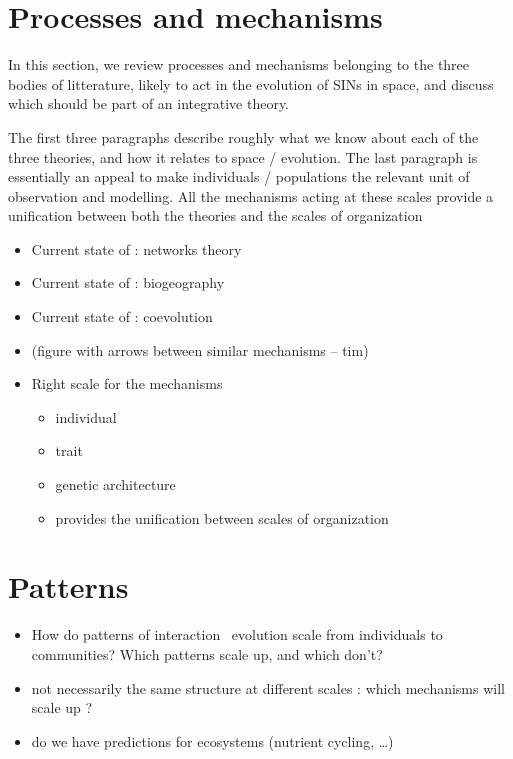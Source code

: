 \documentclass[11pt,oneside]{article}
\begin{document}
\section{Processes and mechanisms}

In this section, we review processes and mechanisms belonging to the three
bodies of litterature, likely to act in the evolution of SINs in space, and
discuss which should be part of an integrative theory.

The first three paragraphs describe roughly what we know about each of the three
theories, and how it relates to space / evolution. The last paragraph is
essentially an appeal to make individuals / populations the relevant unit of
observation and modelling. All the mechanisms acting at these scales provide a
unification between both the theories and the scales of organization

\begin{itemize}
	\item Current state of : networks theory
	\item Current state of : biogeography 
	\item Current state of : coevolution
	\item (figure with arrows between similar mechanisms -- tim)
	\item Right scale for the mechanisms
		\begin{itemize}
			\item individual
			\item trait
			\item genetic architecture
			\item provides the unification between scales of organization
		\end{itemize}
\end{itemize}

\section{Patterns}

\begin{itemize}
    \item How do patterns of interaction \ evolution scale from individuals to
        communities? Which patterns scale up, and which don't?
    \item not necessarily the same structure at different scales : which mechanisms will scale up ?
    \item do we have predictions for ecosystems (nutrient cycling, \ldots)
\end{itemize}
\end{document}
